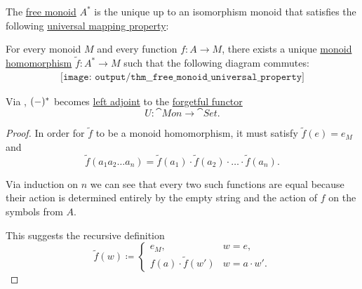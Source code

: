 \begin{theorem}\label{thm:free_monoid_universal_property}
  The \hyperref[def:free_monoid]{free monoid} \( A^* \) is the unique up to an isomorphism monoid that satisfies the following \hyperref[rem:universal_mapping_property]{universal mapping property}:
  \begin{displayquote}
    For every monoid \( M \) and every function \( f: A \to M \), there exists a unique \hyperref[def:monoid/homomorphism]{monoid homomorphism} \( \widetilde{f}: A^* \to M \) such that the following diagram commutes:
    \begin{equation}\label{eq:thm:free_monoid_universal_property/diagram}
      \begin{aligned}
        \texttt{[image: output/thm\_\_free\_monoid\_universal\_property]}
      \end{aligned}
    \end{equation}
  \end{displayquote}
\end{theorem}
\begin{comments}
  \item Via , \( (\Anon*)^* \) becomes \hyperref[def:category_adjunction]{left adjoint} to the \hyperref[def:concrete_category]{forgetful functor}
  \begin{equation*}
    U: \cat{Mon} \to \cat{Set}.
  \end{equation*}
\end{comments}
\begin{proof}
  In order for \( \widetilde{f} \) to be a monoid homomorphism, it must satisfy \( \widetilde{f}(e) = e_M \) and
  \begin{equation*}
    \widetilde{f}(a_1 a_2 \ldots a_n) = \widetilde{f}(a_1) \cdot \widetilde{f}(a_2) \cdot \ldots \cdot \widetilde{f}(a_n).
  \end{equation*}

  Via induction on \( n \) we can see that every two such functions are equal because their action is determined entirely by the empty string and the action of \( f \) on the symbols from \( A \).

  This suggests the recursive definition
  \begin{equation*}
    \widetilde{f}(w) \coloneqq \begin{cases}
      e_M,                         &w = e, \\
      f(a) \cdot \widetilde{f}(w') &w = a \cdot w'.
    \end{cases}
  \end{equation*}
\end{proof}

